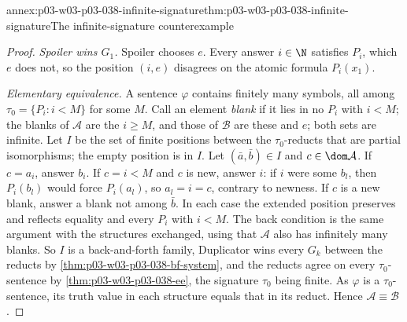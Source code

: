 \begin{annexitem}{annex:p03-w03-p03-038-infinite-signature}{thm:p03-w03-p03-038-infinite-signature}{The infinite-signature counterexample}
\begin{proof}
\emph{Spoiler wins \(G_1\).} Spoiler chooses \(e\). Every answer \(i\in\N\)
satisfies \(P_i\), which \(e\) does not, so the position \((i,e)\) disagrees
on the atomic formula \(P_i(x_1)\).

\emph{Elementary equivalence.} A sentence \(\varphi\) contains finitely many
symbols, all among \(\tau_0=\{P_i:i<M\}\) for some \(M\). Call an element
\emph{blank} if it lies in no \(P_i\) with \(i<M\); the blanks of
\(\mathcal A\) are the \(i\ge M\), and those of \(\mathcal B\) are these and
\(e\); both sets are infinite. Let \(I\) be the set of finite positions between
the \(\tau_0\)-reducts that are partial isomorphisms; the empty position is in
\(I\). Let \((\bar a,\bar b)\in I\) and \(c\in\dom\mathcal A\). If
\(c=a_i\), answer \(b_i\). If \(c=i<M\) and \(c\) is new, answer \(i\): if \(i\)
were some \(b_l\), then \(P_i(b_l)\) would force \(P_i(a_l)\), so \(a_l=i=c\),
contrary to newness. If \(c\) is a new blank, answer a blank not among
\(\bar b\). In each case the extended position preserves and reflects
equality and every \(P_i\) with \(i<M\). The back condition is the same
argument with the structures exchanged, using that \(\mathcal A\) also has
infinitely many blanks. So \(I\) is a back-and-forth family, Duplicator wins
every \(G_k\) between the reducts by \cref{thm:p03-w03-p03-038-bf-system}, and
the reducts agree on every \(\tau_0\)-sentence by
\cref{thm:p03-w03-p03-038-ee}, the signature \(\tau_0\) being finite. As
\(\varphi\) is a \(\tau_0\)-sentence, its truth value in each structure equals
that in its reduct. Hence \(\mathcal A\equiv\mathcal B\).
\end{proof}
\end{annexitem}


